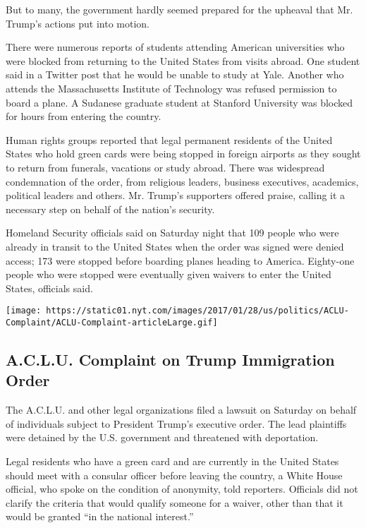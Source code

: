 But to many, the government hardly seemed prepared for the upheaval that
Mr. Trump's actions put into motion.

There were numerous reports of students attending American universities
who were blocked from returning to the United States from visits abroad.
One student said in a Twitter post that he would be unable to study at
Yale. Another who attends the Massachusetts Institute of Technology was
refused permission to board a plane. A Sudanese graduate student at
Stanford University was blocked for hours from entering the country.

Human rights groups reported that legal permanent residents of the
United States who hold green cards were being stopped in foreign
airports as they sought to return from funerals, vacations or study
abroad. There was widespread condemnation of the order, from religious
leaders, business executives, academics, political leaders and others.
Mr. Trump's supporters offered praise, calling it a necessary step on
behalf of the nation's security.

Homeland Security officials said on Saturday night that 109 people who
were already in transit to the United States when the order was signed
were denied access; 173 were stopped before boarding planes heading to
America. Eighty-one people who were stopped were eventually given
waivers to enter the United States, officials said.

\href{https://www.nytimes.com/interactive/2017/01/28/us/politics/ACLU-Complaint.html}{}

\texttt{[image: https://static01.nyt.com/images/2017/01/28/us/politics/ACLU-Complaint/ACLU-Complaint-articleLarge.gif]}

\hypertarget{aclu-complaint-on-trump-immigration-order}{%
\subsection{A.C.L.U. Complaint on Trump Immigration
Order}\label{aclu-complaint-on-trump-immigration-order}}

The A.C.L.U. and other legal organizations filed a lawsuit on Saturday
on behalf of individuals subject to President Trump's executive order.
The lead plaintiffs were detained by the U.S. government and threatened
with deportation.

Legal residents who have a green card and are currently in the United
States should meet with a consular officer before leaving the country, a
White House official, who spoke on the condition of anonymity, told
reporters. Officials did not clarify the criteria that would qualify
someone for a waiver, other than that it would be granted ``in the
national interest.''

